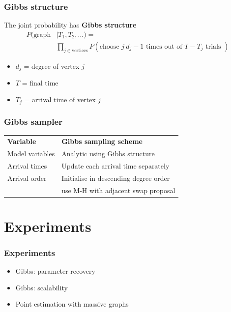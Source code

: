 \documentclass[final,hyperref={pdfpagelabels=false},noamsthm]{beamer}
\begin{document}
\begin{frame}
	\frametitle{Gibbs structure}
	The joint probability has \textbf{Gibbs structure}
	\begin{align*}
	P(\text{graph}&|T_1, T_2, ...) = \\
	& \prod_{j \in \text{vertices}} P(\text{choose }j\ d_j-1\text{ times out of } T - T_j \text{ trials })
	\end{align*}
	\begin{itemize}
		\item $d_j$ = degree of vertex $j$
		\item $T$ = final time
		\item $T_j$ = arrival time of vertex $j$
	\end{itemize}
\end{frame}

\begin{frame}
	\frametitle{Gibbs sampler}
	\begin{center}
		\begin{tabular}{l|l}
			\textbf{Variable} & \textbf{Gibbs sampling scheme} \\
			\Xhline{4\arrayrulewidth}
			\rule{0pt}{3ex}
			Model variables & Analytic using Gibbs structure \\
			\hline
			\rule{0pt}{3ex}
			Arrival times & Update each arrival time separately \\
			\hline
			\rule{0pt}{3ex}
			Arrival order & Initialise in descending degree order \\
			& \quad use M-H with adjacent swap proposal 
		\end{tabular}
	\end{center}
\end{frame}

\section{Experiments}
\begin{frame}
	\frametitle{Experiments}
	\begin{itemize}
		\item Gibbs: parameter recovery
		\item Gibbs: scalability
		\item Point estimation with massive graphs
	\end{itemize}
\end{frame}
\end{document}

